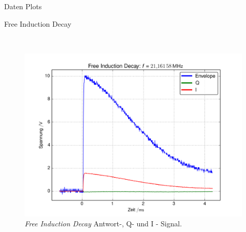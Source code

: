 \begin{appendix}
\begin{chapter}{Daten Plots}
\begin{section}{Free Induction Decay}
\begin{figure}[htb!]
\begin{minipage}{.48\textwidth}
          \caption{\textit{Free Induction Decay} Antwort - Signal und angepasste
            Zerfalls - Funktion nach der erneuten Einstellung der
            Resonanzfrequenz.}
          \label{AnhangfigFIDenv2}
        \end{minipage}\\
        \begin{minipage}{\textwidth}
          \centering
          \includegraphics[width=\textwidth]{Figures/FID_env_Q_I0.png}
          \caption{\textit{Free Induction Decay} Antwort-, Q- und I - Signal.}
          \label{AnhangfigFIDenv3}
        \end{minipage}
      \end{figure}
      
    \end{section}
    

\end{chapter}
\end{appendix}
